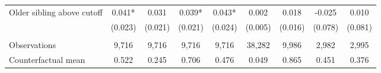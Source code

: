 {{\begin{tabular}{lcccccccc}
Older sibling above cutoff&       0.041*  &       0.031   &       0.039*  &       0.043*  &       0.002   &       0.018   &      -0.025   &       0.010   \\
                    &     (0.023)   &     (0.021)   &     (0.021)   &     (0.024)   &     (0.005)   &     (0.016)   &     (0.078)   &     (0.081)   \\
                    &               &               &               &               &               &               &               &               \\
Observations        &       9,716   &       9,716   &       9,716   &       9,716   &      38,282   &       9,986   &       2,982   &       2,995   \\
Counterfactual mean &       0.522   &       0.245   &       0.706   &       0.476   &       0.049   &       0.865   &       0.451   &       0.376   \\
 

\bottomrule
\end{tabular}
}
}
